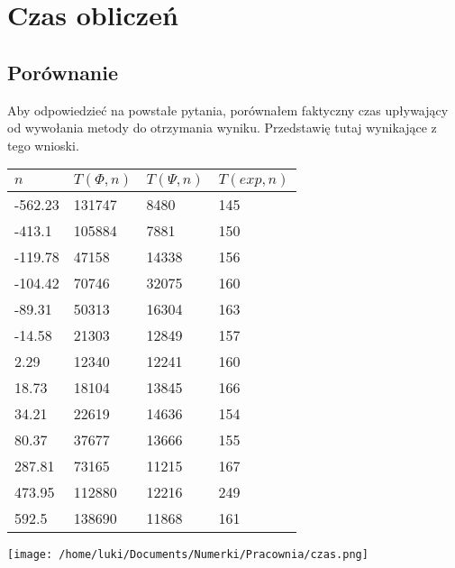 \documentclass[11pt,wide]{mwart}
\begin{document}
\section{Czas obliczeń}
\subsection{Porównanie}
Aby odpowiedzieć na powstałe pytania, porównałem faktyczny czas upływający od wywołania metody do otrzymania wyniku. Przedstawię tutaj wynikające z tego wnioski.\\
\begin{minipage}[c]{0.45\linewidth}
    \begin{tabular}{|l|l|l|l|}
        \hline
        $n$ & $T(\Phi, n)$ & $T(\Psi, n)$ & $T(exp, n)$\\
        \hline
        -562.23 & 131747 & 8480  & 145 \\
         -413.1 & 105884 & 7881  & 150 \\
        -119.78 & 47158 & 14338 & 156 \\
        -104.42 & 70746  & 32075 & 160 \\
         -89.31 & 50313  & 16304 & 163 \\
         -14.58 & 21303  & 12849 & 157 \\
           2.29 & 12340  & 12241 & 160 \\
          18.73 & 18104  & 13845 & 166 \\
          34.21 & 22619  & 14636 & 154 \\
          80.37 & 37677  & 13666 & 155 \\
         287.81 & 73165  & 11215 & 167 \\
         473.95 & 112880 & 12216 & 249 \\
          592.5 & 138690 & 11868 & 161 \\
        \hline
    \end{tabular}
    \label{tab:przyklady}
\end{minipage}
\begin{minipage}[c]{0.45\linewidth}
        \texttt{[image: /home/luki/Documents/Numerki/Pracownia/czas.png]}
        \label{fig:czas}
\end{minipage}
\end{document}
